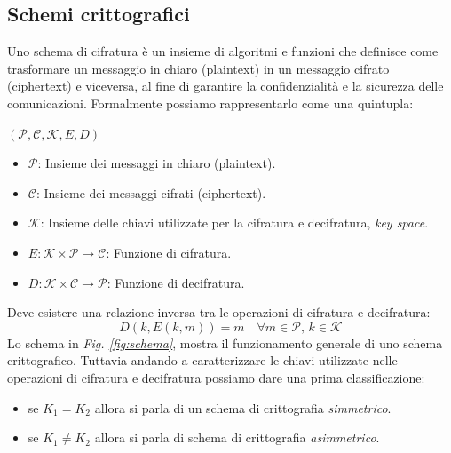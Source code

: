 \subsection{Schemi crittografici}
Uno schema di cifratura è un insieme di algoritmi e funzioni che definisce come trasformare un messaggio in chiaro (plaintext) in un messaggio cifrato (ciphertext) e viceversa, al fine di garantire la confidenzialità e la sicurezza delle comunicazioni.
Formalmente possiamo rappresentarlo come una quintupla: 

\begin{center}
    \((\mathcal{P}, \mathcal{C}, \mathcal{K}, E, D)\)
\end{center}

\begin{itemize}
    \item \(\mathcal{P}\): Insieme dei messaggi in chiaro (plaintext).
    \item \(\mathcal{C}\): Insieme dei messaggi cifrati (ciphertext).
    \item \(\mathcal{K}\): Insieme delle chiavi utilizzate per la cifratura e decifratura, \textit{key space}.
    \item \(E: \mathcal{K} \times \mathcal{P} \to \mathcal{C}\): Funzione di cifratura.
    \item \(D: \mathcal{K} \times \mathcal{C} \to \mathcal{P}\): Funzione di decifratura.
\end{itemize}

\noindent
Deve esistere una relazione inversa tra le operazioni di cifratura e decifratura:
\begin{equation}
D(k, E(k, m)) = m \quad \forall m \in \mathcal{P}, \, k \in \mathcal{K}
\end{equation}
\noindent
Lo schema in \textit{Fig. \ref{fig:schema}}, mostra il funzionamento generale di uno schema crittografico. 
Tuttavia andando a caratterizzare le chiavi utilizzate nelle operazioni di cifratura e decifratura possiamo dare una prima classificazione:
\begin{itemize}
    \item se $K_1 = K_2$ allora si parla di un schema di crittografia \textit{simmetrico}.
    \item se $K_1 \neq K_2$ allora si parla di schema di crittografia \textit{asimmetrico}.
\end{itemize}

